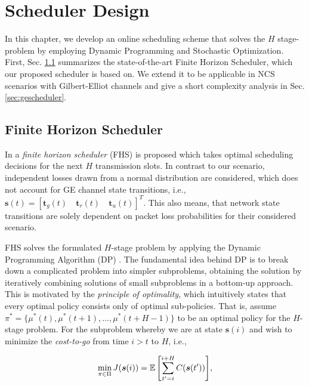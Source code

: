 \chapter{Scheduler Design}

In this chapter, we develop an online scheduling scheme that solves the $H$
stage-problem by employing Dynamic Programming and Stochastic Optimization.
First, Sec. \ref{sec:fhscheduler} summarizes the state-of-the-art Finite Horizon
Scheduler, which our proposed scheduler is based on. We extend it to be
applicable in NCS scenarios with Gilbert-Elliot channels and give a short
complexity analysis in Sec. \ref{sec:gescheduler}.

\section{Finite Horizon Scheduler} \label{sec:fhscheduler}

In \cite{ayan2020aoi} a \textit{finite horizon scheduler} (FHS) is proposed
which takes optimal scheduling decisions for the next $H$ transmission slots. In
contrast to our scenario, independent losses drawn from a normal distribution
are considered, which does not account for GE channel state transitions, i.e.,
$\boldsymbol{s}(t) = \left[\boldsymbol{t}_g(t) \quad \boldsymbol{t}_r(t) \quad
\boldsymbol{t}_u(t) \right]^T$. This also means, that network state transitions
are solely dependent on packet loss probabilities for their considered scenario.

FHS solves the formulated $H$-stage problem by applying the Dynamic Programming
Algorithm (DP) \cite{bertsekas1995dynamic}. The fundamental idea behind DP is to
break down a complicated problem into simpler subproblems, obtaining the
solution by iteratively combining solutions of small subproblems in a bottom-up
approach. This is motivated by the \textit{principle of optimality}, which
intuitively states that every optimal policy consists only of optimal
sub-policies. That is, assume $\pi^* = \{\mu^*(t), \mu^*(t+1), \dots,
\mu^*(t+H-1) \}$ to be an optimal policy for the $H$-stage problem. For the
subproblem whereby we are at state $\boldsymbol{s}(i)$ and wish to minimize the
\textit{cost-to-go} from time $i>t$ to $H$, i.e.,

\begin{equation}
  \label{eq:costtogo}
  \min_{\pi\in\Pi}{J(\boldsymbol{s}(i)) = \mathbb{E} \left[ \sum_{t' = i }^{i+H} C(\boldsymbol{s}(t')) \right]},
\end{equation}

